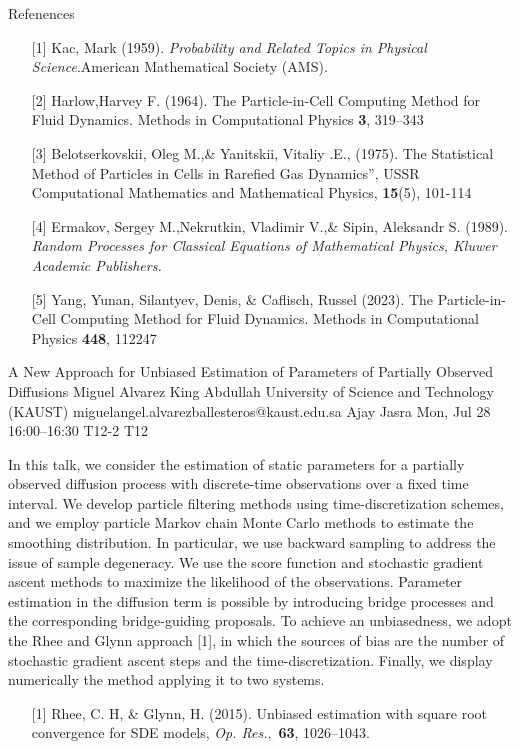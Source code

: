 \begin{talk}
Refenences
\begin{enumerate}
	\item[{[1]}] Kac, Mark (1959). {\it Probability and Related Topics in Physical Science}.American Mathematical Society (AMS).
	\item[{[2]}] Harlow,Harvey F.  (1964).   The Particle-in-Cell Computing Method for Fluid Dynamics. Methods in Computational Physics \textbf{3}, 319--343
\item[{[3]}] Belotserkovskii, Oleg M.,\& Yanitskii, Vitaliy .E.,   (1975).  The Statistical Method of Particles in Cells in Rarefied Gas Dynamics”, USSR Computational Mathematics and Mathematical Physics,  \textbf{15}(5), 101-114
\item[{[4]}] Ermakov, Sergey M.,Nekrutkin, Vladimir V.,\& Sipin, Aleksandr S.  (1989). {\it Random Processes for Classical Equations of Mathematical Physics, Kluwer Academic Publishers.}
\item[{[5]} ] Yang, Yunan, Silantyev, Denis, \&   Caflisch, Russel (2023).   The Particle-in-Cell Computing Method for Fluid Dynamics. Methods in Computational Physics \textbf{448}, 112247
\end{enumerate}

\end{talk}

\begin{talk}
  {A New Approach for Unbiased Estimation of Parameters of Partially Observed Diffusions}%
  {Miguel Alvarez}%
  {King Abdullah University of Science and Technology (KAUST)}%
  {miguelangel.alvarezballesteros@kaust.edu.sa}%
  {Ajay Jasra}%
  {}%
  {Mon, Jul 28 16:00–16:30}%
  {T12-2}%
  {T12}%
  
				
			
In this talk, we consider the estimation of static parameters for a partially observed diffusion process with discrete-time observations over a fixed time interval. We develop particle filtering methods using time-discretization schemes, and we employ particle Markov chain Monte Carlo methods to estimate the smoothing distribution. In particular, we use backward sampling to address the issue of sample degeneracy. We use the score function and stochastic gradient ascent methods to maximize the likelihood of the observations. Parameter estimation in the diffusion term is possible by introducing bridge processes and the corresponding bridge-guiding proposals. To achieve an unbiasedness, we adopt the Rhee and Glynn approach [1], in which the sources of bias are the number of stochastic gradient ascent steps and the time-discretization. Finally, we display numerically the method applying it to two systems. 

\medskip

\begin{enumerate}
	\item[{[1]}] Rhee, C. H, \& Glynn, H. (2015).  Unbiased estimation with square root convergence for SDE models, \emph{Op. Res.},~{\bf 63}, 1026--1043. 
\end{enumerate}

\end{talk}

